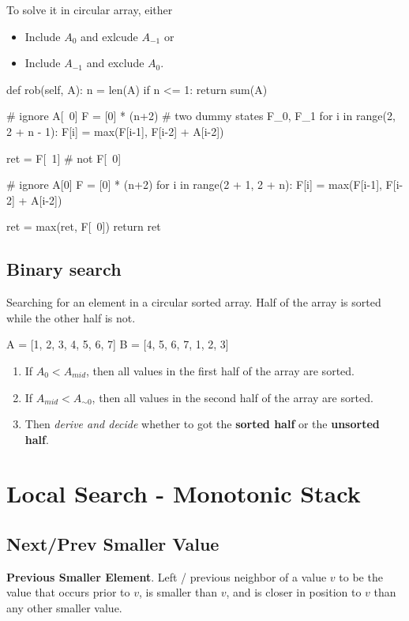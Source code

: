 To solve it in circular array, either 
\begin{itemize}
\item Include $A_0$ and exlcude $A_{-1}$ or 
\item Include $A_{-1}$ and exclude $A_0$.
\end{itemize}
\begin{python}
def rob(self, A):
    n = len(A)
    if n <= 1:
        return sum(A)

    # ignore A[~0]
    F = [0] * (n+2)  # two dummy states F_0, F_1
    for i in range(2, 2 + n - 1):
        F[i] = max(F[i-1], F[i-2] + A[i-2])
    
    ret = F[~1]  # not F[~0]

    # ignore A[0]
    F = [0] * (n+2)
    for i in range(2 + 1, 2 + n):
        F[i] =  max(F[i-1], F[i-2] + A[i-2])
    
    ret = max(ret, F[~0])
    return ret
\end{python}


\subsection{Binary search}
Searching for an element in a circular sorted array. Half of the array is sorted while the other half is not.
\begin{python}
A = [1, 2, 3, 4, 5, 6, 7]
B = [4, 5, 6, 7, 1, 2, 3]
\end{python}
\begin{enumerate}
\item If $A_0 < A_{mid}$, then all values in the first half of the array are sorted.
\item If $A_{mid} < A_{\sim 0}$, then all values in the second half of the array are sorted.
\item Then \textit{derive and decide} whether to got the \textbf{sorted half} or the \textbf{unsorted half}.
\end{enumerate}

\section{Local Search - Monotonic Stack}\label{monostack}
\subsection{Next/Prev Smaller Value}\label{allNearestSmaller}

\textbf{Previous Smaller Element}. Left / previous neighbor of a value $v$ to be the value that occurs prior to $v$, is smaller than $v$, and is closer in position to $v$ than any other smaller value.

